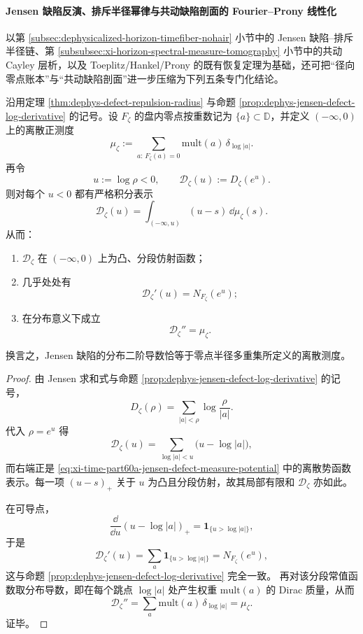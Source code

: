 \paragraph{Jensen 缺陷反演、排斥半径幂律与共动缺陷剖面的 Fourier--Prony 线性化}
以第 \ref{subsec:dephysicalized-horizon-timefiber-nohair} 小节中的
Jensen 缺陷--排斥半径链、第 \ref{subsubsec:xi-horizon-spectral-measure-tomography}
小节中的共动 Cayley 层析，以及
Toeplitz/Hankel/Prony 的既有恢复定理为基础，还可把“径向零点账本”与“共动缺陷剖面”进一步压缩为下列五条专门化结论。

\begin{theorem}\label{thm:xi-time-part60a-jensen-defect-radial-measure-inversion}
沿用定理 \ref{thm:dephys-defect-repulsion-radius} 与命题
\ref{prop:dephys-jensen-defect-log-derivative} 的记号。设
\(F_{\zeta}\) 的盘内零点按重数记为 \(\{a\}\subset\mathbb D\)，并定义
\((-\infty,0)\) 上的离散正测度
\[
\mu_{\zeta}:=
\sum_{a:\,F_{\zeta}(a)=0}\mathrm{mult}(a)\,\delta_{\log|a|}.
\]
再令
\[
u:=\log\rho<0,
\qquad
\mathcal D_{\zeta}(u):=D_{\zeta}(e^u).
\]
则对每个 \(u<0\) 都有严格积分表示
\begin{equation}\label{eq:xi-time-part60a-jensen-defect-measure-potential}
\boxed{\;
\mathcal D_{\zeta}(u)=\int_{(-\infty,u)}(u-s)\,\dd\mu_{\zeta}(s).\;}
\end{equation}
从而：
\begin{enumerate}
  \item \(\mathcal D_{\zeta}\) 在 \((-\infty,0)\) 上为凸、分段仿射函数；
  \item 几乎处处有
  \[
  \mathcal D_{\zeta}'(u)=N_{F_{\zeta}}(e^u);
  \]
  \item 在分布意义下成立
  \[
  \boxed{\;
  \mathcal D_{\zeta}''=\mu_{\zeta}.\;}
  \]
\end{enumerate}
换言之，Jensen 缺陷的分布二阶导数恰等于零点半径多重集所定义的离散测度。
\end{theorem}
\begin{proof}
由 Jensen 求和式与命题 \ref{prop:dephys-jensen-defect-log-derivative} 的记号，
\[
D_{\zeta}(\rho)=\sum_{|a|<\rho}\log\frac{\rho}{|a|}.
\]
代入 \(\rho=e^u\) 得
\[
\mathcal D_{\zeta}(u)
=
\sum_{\log|a|<u}\bigl(u-\log|a|\bigr),
\]
而右端正是 \eqref{eq:xi-time-part60a-jensen-defect-measure-potential}
中的离散势函数表示。每一项 \((u-s)_+\) 关于 \(u\) 为凸且分段仿射，故其局部有限和
\(\mathcal D_{\zeta}\) 亦如此。

在可导点，
\[
\frac{\dd}{\dd u}(u-\log|a|)_+=\mathbf 1_{\{u>\log|a|\}},
\]
于是
\[
\mathcal D_{\zeta}'(u)
=
\sum_a \mathbf 1_{\{u>\log|a|\}}
=
N_{F_{\zeta}}(e^u),
\]
这与命题 \ref{prop:dephys-jensen-defect-log-derivative} 完全一致。
再对该分段常值函数取分布导数，即在每个跳点 \(\log|a|\) 处产生权重
\(\mathrm{mult}(a)\) 的 Dirac 质量，从而
\[
\mathcal D_{\zeta}''=
\sum_a \mathrm{mult}(a)\,\delta_{\log|a|}
=\mu_{\zeta}.
\]
证毕。
\end{proof}

